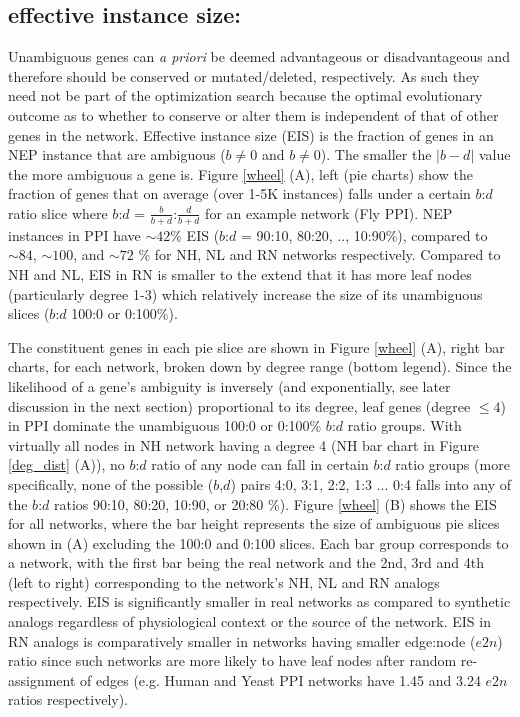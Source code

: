 	\subsection{effective instance size:}\label{sec:EIS}
			Unambiguous genes can \textit{a priori} be deemed  advantageous or disadvantageous and therefore should be conserved or mutated/deleted, respectively.  As such they need not be part of the optimization search because the optimal evolutionary outcome as to whether to conserve or alter them is independent of that of other genes in the network. Effective instance size (EIS) is the fraction of genes in an NEP instance that are ambiguous ($b\neq 0$ and $b\neq 0$). The smaller the $|b-d|$ value the more ambiguous a gene is. Figure \ref{wheel} (A), left (pie charts) show the  fraction of genes that on average (over 1-5K instances) falls under a certain $b$:$d$ ratio slice where $b$:$d$ =  $\frac{b}{b+d}$:$\frac{d}{b+d}$ for an example network (Fly PPI). NEP instances in PPI have ${\sim}42\%$ EIS ($b$:$d$ = 90:10, 80:20, .., 10:90\%), compared to ${\sim}84$, ${\sim}100$, and ${\sim}72$ \% for NH, NL and RN networks respectively. Compared to NH and NL, EIS in RN is smaller to the extend that it has more leaf nodes (particularly degree 1-3) which relatively increase the size of its unambiguous slices ($b$:$d$ 100:0 or 0:100\%).

      The constituent genes in each pie slice are shown in Figure \ref{wheel} (A), right bar charts, for each network, broken down by degree range (bottom legend). Since the likelihood of a gene's ambiguity is inversely (and exponentially, see later discussion in the next section) proportional to its degree, leaf genes (degree $\leq 4$) in PPI dominate the unambiguous 100:0 or 0:100\% $b$:$d$ ratio groups. With virtually all nodes  in NH network having a degree 4 (NH bar chart in Figure \ref{deg_dist} (A)), no $b$:$d$ ratio of any node can fall in certain $b$:$d$ ratio groups (more specifically, none of the possible ($b$,$d$) pairs 4:0, 3:1, 2:2, 1:3 ... 0:4 falls into any of the $b$:$d$ ratios 90:10, 80:20, 10:90, or  20:80 \%). Figure \ref{wheel} (B) shows the EIS for all networks, where the bar height represents the size of ambiguous pie slices shown in (A) excluding the 100:0 and 0:100 slices. Each bar group corresponds to a network, with the first bar being the real network and the 2nd, 3rd and 4th (left to right) corresponding to the network's NH, NL and RN analogs respectively. EIS is significantly smaller in real networks as compared to synthetic analogs regardless of physiological context or the source of the network. EIS in RN analogs is comparatively smaller in networks having smaller edge:node ($e2n$) ratio since such networks are more likely to have leaf nodes after random re-assignment of edges (e.g. Human and Yeast PPI networks have 1.45 and 3.24 $e2n$ ratios respectively).

